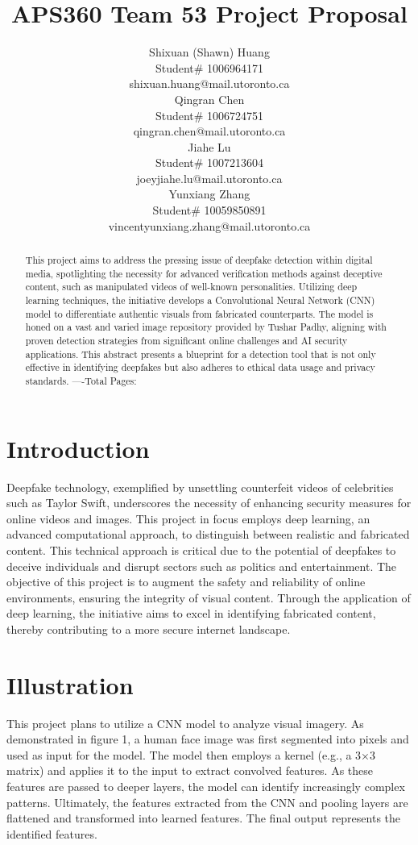 \documentclass{article} %
\title{APS360 Team 53 Project Proposal}
\author{Shixuan (Shawn) Huang  \\
Student\# 1006964171\\
shixuan.huang@mail.utoronto.ca \\
\And 
Qingran Chen  \\
Student\# 1006724751 \\
qingran.chen@mail.utoronto.ca \\
\AND
Jiahe Lu  \\
Student\# 1007213604 \\
joeyjiahe.lu@mail.utoronto.ca \\
\And
Yunxiang Zhang\\
Student\# 10059850891 \\
vincentyunxiang.zhang@mail.utoronto.ca \\
\AND
}
\begin{document}
\maketitle

\begin{abstract}
This project aims to address the pressing issue of deepfake detection within digital media, spotlighting the necessity for advanced verification methods against deceptive content, such as manipulated videos of well-known personalities. Utilizing deep learning techniques, the initiative develops a Convolutional Neural Network (CNN) model to differentiate authentic visuals from fabricated counterparts. The model is honed on a vast and varied image repository provided by Tushar Padhy, aligning with proven detection strategies from significant online challenges and AI security applications. This abstract presents a blueprint for a detection tool that is not only effective in identifying deepfakes but also adheres to ethical data usage and privacy standards.
----Total Pages: \pageref{last_page}
\end{abstract}



\section{Introduction}


Deepfake technology, exemplified by unsettling counterfeit videos of celebrities such as Taylor Swift, underscores the necessity of enhancing security measures for online videos and images. This project in focus employs deep learning, an advanced computational approach, to distinguish between realistic and fabricated content. This technical approach is critical due to the potential of deepfakes to deceive individuals and disrupt sectors such as politics and entertainment. The objective of this project is to augment the safety and reliability of online environments, ensuring the integrity of visual content. Through the application of deep learning, the initiative aims to excel in identifying fabricated content, thereby contributing to a more secure internet landscape.


\section{Illustration}
\label{gen_inst}

This project plans to utilize a CNN model to analyze visual imagery. As demonstrated in figure 1, a human face image was first segmented into pixels and used as input for the model. The model then employs a kernel (e.g., a 3×3 matrix) and applies it to the input to extract convolved features. As these features are passed to deeper layers, the model can identify increasingly complex patterns. Ultimately, the features extracted from the CNN and pooling layers are flattened and transformed into learned features. The final output represents the identified features.
\end{document}
